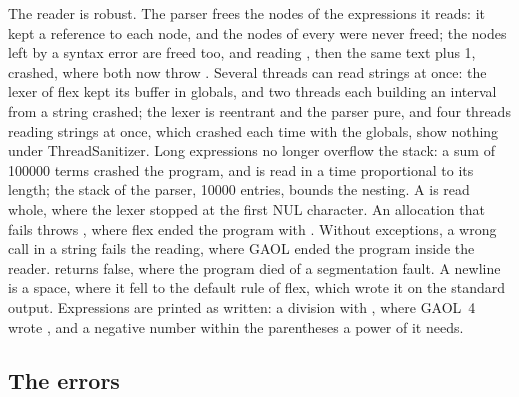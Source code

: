 \documentclass[12pt,a4paper,twoside,openright]{book}
\begin{document}
\medskip
The reader is robust.\newinvfive{} The parser frees the nodes of the
expressions it reads: it kept a reference to each node, and the nodes of
every  were never freed; the nodes left by a syntax
error are freed too, and reading , then the same
text plus 1, crashed, where both now throw .
Several threads can read strings at once: the lexer of flex kept its buffer
in globals, and two threads each building an interval from a string crashed;
the lexer is reentrant and the parser pure, and four threads reading strings
at once, which crashed each time with the globals, show nothing under
ThreadSanitizer. Long expressions no longer overflow the stack: a sum of
100000 terms crashed the program, and is read in a time proportional to its
length; the stack of the parser, 10000 entries, bounds the nesting. A
 is read whole, where the lexer stopped at the first NUL
character. An allocation that fails throws , where
flex ended the program with . Without exceptions, a wrong call
in a string fails the reading, where GAOL ended the program inside the
reader.  returns false, where the program
died of a segmentation fault. A newline is a space, where it fell to the
default rule of flex, which wrote it on the standard output. Expressions are
printed as written: a division with \code{/}, where GAOL~4 wrote \code{*},
and a negative number within the parentheses a power of it needs.

\subsection{The errors}
\label{sec:changes-errors}
%
\end{document}
